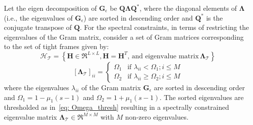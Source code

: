 Let the eigen decomposition of $\bm{G}_{\epsilon}$ be $\bm{Q}\bm{\Lambda}\bm{Q}^{*}$, where the diagonal elements of $\bm{\Lambda}$ (i.e., the eigenvalues of $\bm{G}_{\epsilon}$) are sorted in descending order and $\bm{Q}^{*}$ is the conjugate transpose of $\bm{Q}$. For the spectral constraints, in terms of restricting the eigenvalues of the Gram matrix, consider a set of Gram matrices corresponding to the set of tight frames given by: 
%
\begin{equation}
    \label{eq: Spectral_fn}
    \bm{\mathcal{H}}_{\bm{\mathcal{T}}}=\left\{\bm{H}\in\Re^{L\times L},\bm{H}=\bm{H}^{T},\,
    \text{and eigenvalue matrix}\, \bm{\Lambda}_{\bm{\mathcal{T}}}\right\}
\end{equation}
\begin{equation}
    \label{eq: Omega_thresh}
    \left[\bm{\Lambda}_{\bm{\mathcal{T}}}\right]_{ii} =
    \begin{cases}
      \Omega_{1} & \text{if } \lambda_{ii} < \Omega_{1}; i \leq M \\
      \Omega_{2} & \text{if }\lambda_{ii}\geq \Omega_{2}; i \leq M 
    \end{cases} 
\end{equation}
%
where the eigenvalues $\lambda_{ii}$ of the Gram matrix $\bm{G}_{\epsilon}$ are sorted in descending order and $\Omega_{1} = 1-\mu_{1}(s-1)$ and $\Omega_{2}=1+\mu_{1}(s-1)$. The sorted eigenvalues are thresholded as in~\eqref{eq: Omega_thresh} resulting in a spectrally constrained eigenvalue matrix $\bm{\Lambda}_{\bm{\mathcal{T}}} \in \Re^{M \times M}$ with $M$ non-zero eigenvalues. 

